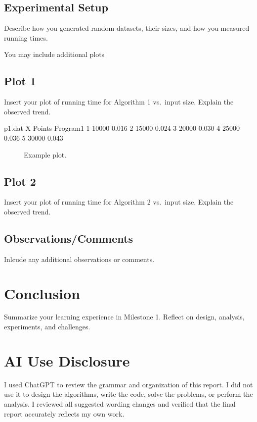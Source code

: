 \documentclass{article}
\begin{document}
\subsection{Experimental Setup}
{\color{red} Describe how you generated random datasets, their sizes, and how you measured running times.

You may include additional plots


}

\subsection{Plot 1}
{\color{red} Insert your plot of running time for Algorithm 1 vs.\ input size. Explain the observed trend.}

\begin{filecontents}{p1.dat}
X   Points   Program1
1   10000    0.016
2   15000    0.024
3   20000    0.030
4   25000    0.036
5   30000    0.043
\end{filecontents}

\begin{figure}[H]
\centering
{}
\caption{Example plot.}
\label{plot1}
\end{figure}

\subsection{Plot 2}
{\color{red} Insert your plot of running time for Algorithm 2 vs.\ input size. Explain the observed trend.}

\subsection{Observations/Comments}
{\color{red} Inlcude any additional observations or comments.}

\section{Conclusion}
{\color{red} Summarize your learning experience in Milestone 1. Reflect on design, analysis, experiments, and challenges.}

\section{AI Use Disclosure}

I used ChatGPT to review the grammar and organization of this report. I did not use it to design the algorithms, write the code, solve the problems, or perform the analysis. I reviewed all suggested wording changes and verified that the final report accurately reflects my own work.
\end{document}
